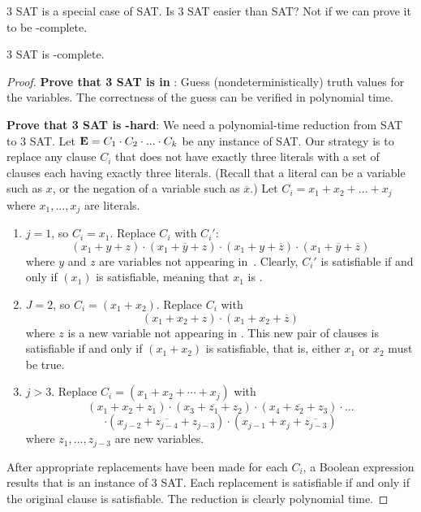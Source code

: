 \begin{example}

3 SAT is a special case of SAT.
Is 3 SAT easier than SAT?
Not if we can prove it to be \NP-complete.

\begin{theorem}
3 SAT is \NP-complete.
\end{theorem}

\begin{proof}
\textbf{Prove that 3 SAT is in \NP}:
Guess (nondeterministically) truth values for the variables.
The correctness of the guess can be verified in polynomial time.

\textbf{Prove that 3 SAT is \NP-hard}:
We need a polynomial-time reduction from SAT to 3 SAT.
Let \({\textbf{E}} = C_1 \cdot C_2 \cdot ... \cdot C_k\) be any instance
of SAT.
Our strategy is to replace any clause \(C_i\) that does not have
exactly three literals with a set of clauses each having exactly three
literals.
(Recall that a literal can be a variable such as \(x\), or the
negation of a variable such as \(\overline{x}\).)
Let \(C_i = x_1 + x_2 + ... + x_j\) where \(x_1, ..., x_j\) are literals.

\begin{enumerate}
\item \(j = 1\), so \(C_i = x_1\).
Replace \(C_i\) with \(C_i'\):
\[(x_1 + y + z) \cdot (x_1 + \overline{y} + z) \cdot
  (x_1 + y + \overline{z}) \cdot (x_1 + \overline{y} + \overline{z})\]
\noindent where \(y\) and \(z\) are variables not appearing
in~.
Clearly, \(C_i'\) is satisfiable if and only if
\((x_1)\) is satisfiable, meaning that \(x_1\) is \TRUE.

\item \(J = 2\), so \(C_i = (x_1 + x_2)\).
Replace \(C_i\) with
\[(x_1 + x_2 + z) \cdot (x_1 + x_2 + \overline{z})\]
\noindent where \(z\) is a new variable not appearing in .
This new pair of clauses is satisfiable if and only if \((x_1 + x_2)\)
is satisfiable, that is, either \(x_1\) or \(x_2\) must be true.

\item \(j > 3\).  Replace \(C_i = (x_1 + x_2 + \cdots + x_j)\) with
\[(x_1 + x_2 + z_1) \cdot (x_3 + \overline{z_1} + z_2) \cdot
(x_4 + \overline{z_2} + z_3) \cdot ...\]
\[\cdot (x_{j-2} +
\overline{z_{j-4}} + z_{j-3}) \cdot (x_{j-1} + x_j +
\overline{z_{j-3}})\]
\noindent where \(z_1, ..., z_{j-3}\) are new variables.
\end{enumerate}

After appropriate replacements have been made for each \(C_i\), a
Boolean expression results that is an instance of 3 SAT.
Each replacement is satisfiable if and only if the original clause is
satisfiable.
The reduction is clearly polynomial time.


\end{proof}
\end{example}
